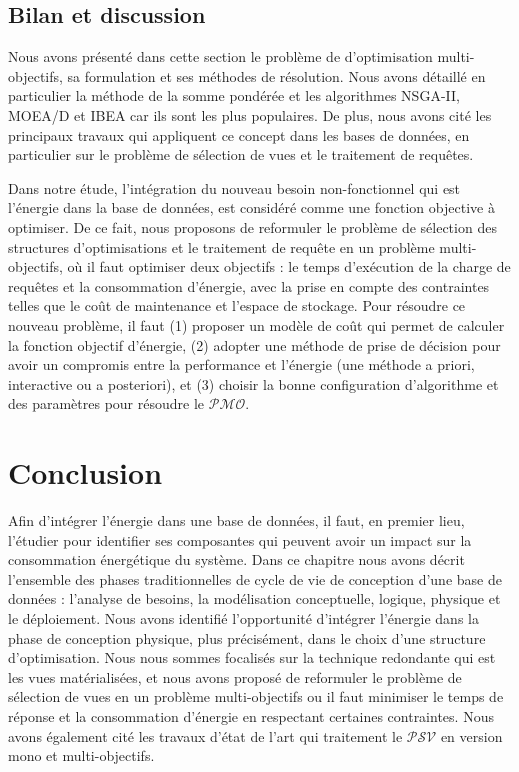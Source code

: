 \subsection{Bilan et discussion}
Nous avons présenté dans cette section le problème de d'optimisation multi-objectifs, sa formulation et ses méthodes de résolution. Nous avons détaillé en particulier la méthode de la somme pondérée et les algorithmes NSGA-II, MOEA/D et IBEA car ils sont les plus populaires. De plus, nous avons cité les principaux travaux qui appliquent ce concept dans les bases de données, en particulier sur le problème de sélection de vues et le traitement de requêtes.

Dans notre étude, l'intégration du nouveau besoin non-fonctionnel qui est l'énergie dans la base de données, est considéré comme une fonction objective à optimiser. De ce fait, nous proposons de reformuler le problème de sélection des structures d'optimisations et le traitement de requête en un problème multi-objectifs, où il faut optimiser deux objectifs : le temps d'exécution de la charge de requêtes et la consommation d’énergie, avec la prise en compte des contraintes telles que le coût de maintenance et l'espace de stockage. Pour résoudre ce nouveau problème, il faut (1) proposer un modèle de coût qui permet de calculer la fonction objectif d'énergie, (2) adopter une méthode de prise de décision pour avoir un compromis entre la performance et l'énergie (une méthode a priori, interactive ou a posteriori), et (3) choisir la bonne configuration d'algorithme et des paramètres pour résoudre le $\mathcal{PMO}$.

\section{Conclusion}\label{sec:Conclusion}
Afin d'intégrer l'énergie dans une base de données, il faut, en premier lieu, l'étudier pour identifier ses composantes qui peuvent avoir un impact sur la consommation énergétique du système. Dans ce chapitre nous avons décrit l'ensemble des phases traditionnelles de cycle de vie de conception d’une base de données : l’analyse de besoins, la modélisation conceptuelle, logique, physique et le déploiement. Nous avons identifié l’opportunité d'intégrer l'énergie dans la phase de conception physique, plus précisément, dans le choix d'une structure d'optimisation. Nous nous sommes focalisés sur la technique redondante qui est les vues matérialisées, et nous avons proposé de reformuler le problème de sélection de vues en un problème multi-objectifs ou il faut minimiser le temps de réponse et la consommation d'énergie en respectant certaines contraintes. Nous avons également cité les travaux d'état de l'art qui traitement le $\mathcal{PSV}$ en version mono et multi-objectifs.

